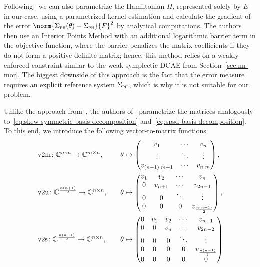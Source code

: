 Following~\cite{Najnudel2021} we can also parametrize the Hamiltonian $H$, represented solely by $E$ in our case, using a parametrized kernel estimation and calculate the gradient of the error $\norm{\Sigma_\msc{ph}(\theta) - \Sigma_\msc{ph}}{F}^2$ by analytical computations.
The authors then use an Interior Points Method with an additional logarithmic barrier term in the objective function, where the barrier penalizes the matrix coefficients if they do not form a positive definite matrix; hence, this method relies on a weakly enforced constraint similar to the weak symplectic \ac{DCAE} from Section~\ref{sec:nn-mor}.
The biggest downside of this approach is the fact that the error measure requires an explicit reference system $\Sigma_{\textnormal{\scshape ph}}$, which is why it is not suitable for our problem.

Unlike the approach from~\cite{Najnudel2021}, the authors of~\cite{Schwerdtner2021, SV2021, Schwerdtner2023, SV2023} parametrize the matrices analogously to~\eqref{eq:skew-symmetric-basis-decomposition} and~\eqref{eq:spsd-basis-decomposition}.
To this end, we introduce the following vector-to-matrix functions
\begin{alignat}{4}
    &\mathop{}\!\mathrm{v}2\mathrm{m} \colon \mathbb{C}^{n \cdot m} \to \mathbb{C}^{m \times n},\quad &&\theta \mapsto \begin{pmatrix}
        v_1 & \cdots & v_n \\
        \vdots & \ddots & \vdots \\
        v_{(n - 1) \cdot m + 1} & \cdots & v_{n \cdot m}
    \end{pmatrix}, \label{eq:v2m}\\
    &\mathop{}\!\mathrm{v}2\mathrm{u} \colon \mathbb{C}^{\frac{n (n + 1)}{2}} \to \mathbb{C}^{n \times n},\quad &&\theta \mapsto \begin{pmatrix}
        v_1 & v_2 & \cdots & v_n \\
        0 & v_{n + 1} & \cdots & v_{2n - 1} \\
        0 & 0 & \ddots & \vdots \\
        0 & 0 & 0 & v_{\frac{n (n + 1)}{2}}
    \end{pmatrix}, \label{eq:v2u}\\
    &\mathop{}\!\mathrm{v}2\mathrm{s} \colon \mathbb{C}^{\frac{n (n - 1)}{2}} \to \mathbb{C}^{n \times n},\quad &&\theta \mapsto \begin{pmatrix}
        0 & v_1 & v_2 & \cdots & v_{n - 1} \\
        0 & 0 & v_n & \cdots & v_{2n - 2} \\
        0 & 0 & 0 & \ddots & \vdots \\
        0 & 0 & 0 & 0 & v_{\frac{n (n - 1)}{2}} \\
        0 & 0 & 0 & 0 & 0
    \end{pmatrix} \label{eq:v2s}
\end{alignat}
